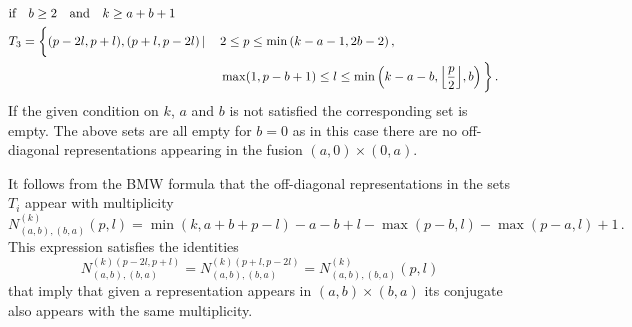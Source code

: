 \documentclass[a4paper,11pt]{article}
\DeclarePairedDelimiter\floor{\lfloor}{\rfloor}
\theoremstyle{plain}
\theoremstyle{definition}
\begin{document}
     \begin{align}\label{offdiag4}
    & \text{if} \quad b\geq 2 \quad \text{and} \quad k\geq a+b+1 \nonumber\\
     &  T_3=\bigg\{(p-2l,p+l),(p+l,p-2l)\,|\, && 2\leq  p\leq \operatorname{min}\left(k-a-1,2b-2\right), \nonumber \\
         & && \operatorname{max}(1,p-b+1)\leq  l\leq \operatorname{min}\left(k-a-b,\floor*{\frac{p}{2}},b\right) \bigg\}\, .
    \end{align}
    If the given condition on $k$, $a$ and $b$ is not satisfied the corresponding set is empty.
    The above sets are all empty for  $b=0$ as in this case there are no off-diagonal representations appearing in the fusion $(a,0)\times (0,a)$. 
    
It follows from the BMW formula that the off-diagonal representations in the sets $T_{i}$  appear with multiplicity
\begin{equation}\label{offdiagmult}
    N^{(k)}_{(a,b),(b,a)}(p,l)=\operatorname{min}(k,a+b+p-l)-a-b+l-\operatorname{max}(p-b,l)-\operatorname{max}(p-a,l)+1\, .
\end{equation}
This expression satisfies the identities 
\begin{equation}
N^{(k)(p-2l,p+l)}_{(a,b),(b,a)}=N^{(k)(p+l,p-2l)}_{(a,b),(b,a)}= N^{(k)}_{(a,b),(b,a)}(p,l)
\end{equation}
that imply that  given  a representation appears in $(a,b)\times (b,a)$  its conjugate also appears with the same multiplicity.
\end{document}
